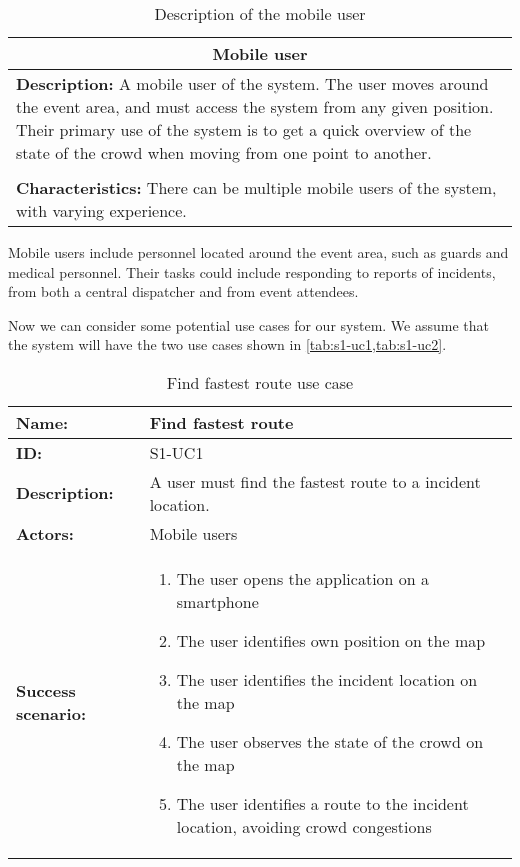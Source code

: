 \begin{table}[h!]
    \centering
    \begin{tabularx}{/8}{X}
        \toprule
        \multicolumn{1}{c}{\textbf{Mobile user}} \\ 
        \midrule
        \textbf{Description:} A mobile user of the system. The user moves around the event area, and must access the system from any given position. Their primary use of the system is to get a quick overview of the state of the crowd when moving from one point to another. \\
        \\
        \textbf{Characteristics:} There can be multiple mobile users of the system, with varying experience. \\
        \bottomrule
    \end{tabularx}
    \caption{Description of the mobile user}
    \label{tab:mob_user}
\end{table}

Mobile users include personnel located around the event area, such as guards and medical personnel. Their tasks could include responding to reports of incidents, from both a central dispatcher and from event attendees.

Now we can consider some potential use cases for our system. We assume that the system will have the two use cases shown in \cref{tab:s1-uc1,tab:s1-uc2}.

\begin{table}[h!]
    \centering
    \begin{tabularx}{\textwidth}{|l|X|}
        \hline
        \textbf{Name:}  & Find fastest route \\ \hline
        \textbf{ID:}    & S1-UC1 \\ \hline
        \textbf{Description:} & A user must find the fastest route to a incident location. \\ \hline
        \textbf{Actors:} & Mobile users \\ \hline
        \textbf{Success scenario:} & 
        \begin{enumerate}
            \item The user opens the application on a smartphone
            \item The user identifies own position on the map
            \item The user identifies the incident location on the map
            \item The user observes the state of the crowd on the map
            \item The user identifies a route to the incident location, avoiding crowd congestions
        \end{enumerate}
        \\
        \hline
    \end{tabularx}
    \caption{Find fastest route use case}
    \label{tab:s1-uc1}
\end{table}

